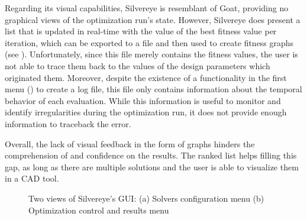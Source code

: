 	Regarding its visual capabilities, Silvereye is resemblant of Goat, providing no graphical views of the optimization run's state. However, Silvereye does present a list that is updated in real-time with the value of the best fitness value per iteration, which can be exported to a file and then used to create fitness graphs (see ). Unfortunately, since this file merely contains the fitness values, the user is not able to trace them back to the values of the design parameters which originated them. Moreover, despite the existence of a functionality in the first menu () to create a log file, this file only contains information about the temporal behavior of each evaluation. While this information is useful to monitor and identify irregularities during the optimization run, it does not provide enough information to traceback the error. 
	
	Overall, the lack of visual feedback in the form of graphs hinders the comprehension of and confidence on the results. The ranked list helps filling this gap, as long as there are multiple solutions and the user is able to visualize them in a \ac{CAD} tool.
	
	\begin{figure}[htbp]
		\centering
		\hfill
		
		\caption[Silvereye GUI]{Two views of Silvereye's \ac{GUI}: (a) Solvers configuration menu (b) Optimization control and results menu}
		\label{fig:silvereye}
	\end{figure}
	
